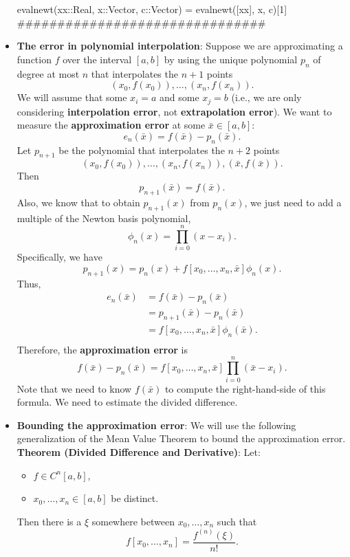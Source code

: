 \documentclass{report}
\begin{document}
\begin{itemize}
\begin{cppcode}
evalnewt(xx::Real, x::Vector, c::Vector) = evalnewt([xx], x, c)[1]
###############################
    \end{cppcode}
\item \textbf{The error in polynomial interpolation}:
    Suppose we are approximating a function $f$ over the interval $[a,b]$ by using the unique polynomial $p_n$ of degree at most $n$ that interpolates the $n+1$ points
    $$(x_0,f(x_0)), \ldots, (x_n,f(x_n)).$$
    We will assume that some $x_i = a$ and some $x_j = b$ (i.e., we are only considering \textbf{interpolation error}, not \textbf{extrapolation error}).
    \bigbreak \noindent 
    We want to measure the \textbf{approximation error} at some $\bar x \in [a,b]$:
    $$e_n(\bar x) = f(\bar x) - p_n(\bar x).$$
    \bigbreak \noindent 
    Let $p_{n+1}$ be the polynomial that interpolates the $n+2$ points
    $$(x_0,f(x_0)), \ldots, (x_n,f(x_n)), (\bar x,f(\bar x)).$$
    \bigbreak \noindent 
    Then
    $$p_{n+1}(\bar x) = f(\bar x).$$
    Also, we know that to obtain $p_{n+1}(x)$ from $p_n(x)$, we just need to add a multiple of the Newton basis polynomial,
    $$\phi_n(x) = \prod_{i=0}^n (x - x_i).$$
    Specifically, we have
    $$p_{n+1}(x) = p_n(x) + f[x_0,\ldots,x_n,\bar x] \phi_n(x).$$
    \bigbreak \noindent 
    Thus, 
    \begin{align*}
        e_n(\bar x) 
& = f(\bar x) - p_n(\bar x) \\
& = p_{n+1}(\bar x) - p_n(\bar x) \\
& = f[x_0,\ldots,x_n,\bar x] \phi_n(\bar x).\\
    \end{align*}
    Therefore, the \textbf{approximation error} is
    $$f(\bar x) - p_n(\bar x) = f[x_0,\ldots,x_n,\bar x] \prod_{i=0}^n (\bar x-x_i).$$
    Note that we need to know $f(\bar x)$ to compute the right-hand-side of this formula. We need to estimate the divided difference.
\item \textbf{Bounding the approximation error}:
    We will use the following generalization of the Mean Value Theorem to bound the approximation error.
    \bigbreak \noindent 
    \textbf{Theorem (Divided Difference and Derivative)}:
    Let:
    \begin{itemize}
        \item $f \in C^n[a,b]$,
        \item $x_0,\ldots,x_n \in [a,b]$ be distinct. 
    \end{itemize}
    Then there is a $\xi$ somewhere between $x_0,\ldots,x_n$ such that
    $$ f[x_0,\ldots,x_n] = \frac{f^{(n)}(\xi)}{n!}. $$

\end{itemize}
\end{document}
